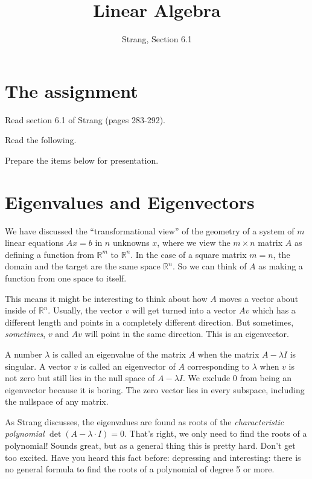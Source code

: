 \documentclass[11pt]{amsart}
\theoremstyle{definition}
\begin{document}
\title{Linear Algebra}
\author{Strang, Section 6.1}
\maketitle

\section{The assignment}
\begin{compactitem}
\item Read section 6.1 of Strang (pages 283-292).
\item Read the following.
\item Prepare the items below for presentation.
\end{compactitem}


\section{Eigenvalues and Eigenvectors}

We have discussed the ``transformational view'' of the geometry of a system of $m$ linear equations $Ax = b$ in $n$ unknowns $x$, where we view the $m \times n$ matrix $A$ as defining
a function from $\mathbb{R}^m$ to $\mathbb{R}^n$. In the case of a square matrix $m=n$, the domain and the target are the same space $\mathbb{R}^n$. So we can think of $A$ as making a function from one space to itself.

This means it might be interesting to think about how $A$ moves a vector about inside of $\mathbb{R}^n$. Usually, the vector $v$ will get turned into a vector $Av$ which has a different length and points in a completely different direction. But sometimes, \emph{sometimes}, $v$ and $Av$ will point in the same direction. This is an eigenvector.

A number $\lambda$ is called an eigenvalue of the matrix $A$ when the matrix $A-\lambda I$ is singular. A vector $v$ is called an eigenvector of $A$ corresponding to $\lambda$ when $v$ is not zero but still lies in the null space of $A-\lambda I$. We exclude $0$ from being an eigenvector because it is boring. The zero vector lies in every subspace, including the nullspace of any matrix.

As Strang discusses, the eigenvalues are found as roots of the \emph{characteristic polynomial} $\det(A-\lambda \cdot I) = 0$. That's right, we only need to find the roots of a polynomial! Sounds great, but as a general thing this is pretty hard. Don't get too excited. Have you heard this fact before: depressing and interesting: there is no general formula to find the roots of a polynomial of degree 5 or more. 
\end{document}
